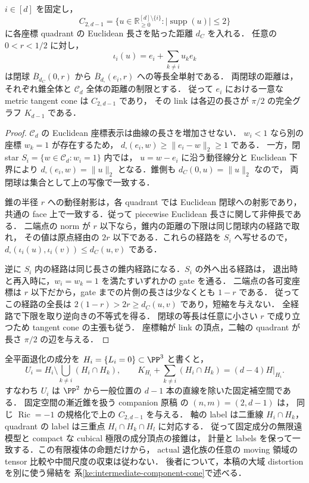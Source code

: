 \begin{proposition}[成分頂点近傍の厳密な錐模型]
\label{topo:component-cone-germ}
$i\in[d]$ を固定し，
\[
 C_{2,d-1}=\{u\in\mathbb R_{\ge0}^{[d]\setminus\{i\}}:
                   |\operatorname{supp}(u)|\le2\}
\]
に各座標 quadrant の Euclidean 長さを貼った距離 $d_C$ を入れる．
任意の $0<r<1/2$ に対し，
\[
 \iota_i(u)=e_i+\sum_{k\ne i}u_ke_k
\]
は閉球 $\overline B_{d_C}(0,r)$ から
$\overline B_{d_\square}(e_i,r)$ への等長全単射である．
両閉球の距離は，それぞれ錐全体と $\mathcal C_d$ 全体の距離の制限とする．
従って $e_i$ における一意な metric tangent cone は $C_{2,d-1}$ であり，
その link は各辺の長さが $\pi/2$ の完全グラフ $K_{d-1}$ である．
\end{proposition}
\begin{proof}
$\mathcal C_d$ の Euclidean 座標表示は曲線の長さを増加させない．
$w_i<1$ なら別の座標 $w_k=1$ が存在するため，
$d_\square(e_i,w)\ge\|e_i-w\|_2\ge1$ である．
一方，閉 star $S_i=\{w\in\mathcal C_d:w_i=1\}$ 内では，
$u=w-e_i$ に沿う動径線分と Euclidean 下界により
$d_\square(e_i,w)=\|u\|_2$ となる．錐側も $d_C(0,u)=\|u\|_2$ なので，
両閉球は集合として上の写像で一致する．

錐の半径 $r$ への動径射影は，各 quadrant では Euclidean 閉球への射影であり，
共通の face 上で一致する．従って piecewise Euclidean 長さに関して非伸長である．
二端点の norm が $r$ 以下なら，錐内の距離の下限は同じ閉球内の経路で取れ，
その値は原点経由の $2r$ 以下である．これらの経路を $S_i$ へ写せるので，
$d_\square(\iota_i(u),\iota_i(v))\le d_C(u,v)$ である．

逆に $S_i$ 内の経路は同じ長さの錐内経路になる．$S_i$ の外へ出る経路は，
退出時と再入時に，$w_i=w_k=1$ を満たすいずれかの gate を通る．
二端点の各可変座標は $r$ 以下だから，gate までの片側の長さは少なくとも $1-r$ である．
従ってこの経路の全長は $2(1-r)>2r\ge d_C(u,v)$ であり，短縮を与えない．
全経路で下限を取り逆向きの不等式を得る．
閉球の等長は任意に小さい $r$ で成り立つため tangent cone の主張も従う．
座標軸が link の頂点，二軸の quadrant が長さ $\pi/2$ の辺を与える．
\end{proof}

全平面退化の成分を $H_i=\{L_i=0\}\subset\PP^3$ と書くと，
\[
 U_i=H_i\setminus\bigcup_{k\ne i}(H_i\cap H_k),\qquad
 K_{H_i}+\sum_{k\ne i}(H_i\cap H_k)=(d-4)H|_{H_i}.
\]
すなわち $U_i$ は $\PP^2$ から一般位置の $d-1$ 本の直線を除いた固定補空間である．
固定空間の漸近錐を扱う companion 原稿
\cite[\texttt{cor:arrangement-cone}]{MultiscaleKECurrent}の $(n,m)=(2,d-1)$ は，
同じ $\operatorname{Ric}=-1$ の規格化で上の $C_{2,d-1}$ を与える．
軸の label は二重線 $H_i\cap H_k$，quadrant の label は三重点 $H_i\cap H_k\cap H_l$ に対応する．
従って固定成分の無限遠模型と compact な cubical 極限の成分頂点の接錐は，
計量と labels を保って一致する．この有限複体の命題だけから，
actual 退化族の任意の moving 領域の tensor 比較や中間尺度の収束は従わない．
後者について，本稿の大域 distortion を別に使う帰結を
系\ref{ke:intermediate-component-cone}で述べる．

